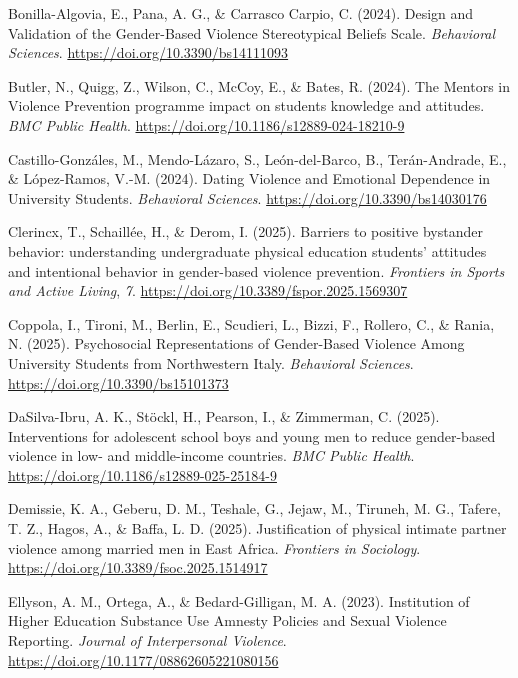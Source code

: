 \documentclass[
  spanish,
  11pt,
  letterpaper,
  DIV=11,
  numbers=noendperiod]{scrreprt}
\newlength{\cslhangindent}
\newenvironment{CSLReferences}[2] %
 {\begin{list}{}{%
  \setlength{\itemindent}{0pt}
  \setlength{\leftmargin}{0pt}
  \setlength{\parsep}{0pt}
  \ifodd #1
   \setlength{\leftmargin}{\cslhangindent}
   \setlength{\itemindent}{-1\cslhangindent}
  \fi
  \setlength{\itemsep}{#2\baselineskip}}}
 {\end{list}}
\begin{document}
\begin{CSLReferences}{1}{0}
Bonilla-Algovia, E., Pana, A. G., \& Carrasco Carpio, C. (2024). Design
and Validation of the Gender-Based Violence Stereotypical Beliefs Scale.
\emph{Behavioral Sciences}. \url{https://doi.org/10.3390/bs14111093}

Butler, N., Quigg, Z., Wilson, C., McCoy, E., \& Bates, R. (2024). The
Mentors in Violence Prevention programme impact on students knowledge
and attitudes. \emph{BMC Public Health}.
\url{https://doi.org/10.1186/s12889-024-18210-9}

Castillo-Gonzáles, M., Mendo-Lázaro, S., León-del-Barco, B.,
Terán-Andrade, E., \& López-Ramos, V.-M. (2024). Dating Violence and
Emotional Dependence in University Students. \emph{Behavioral Sciences}.
\url{https://doi.org/10.3390/bs14030176}

Clerincx, T., Schaillée, H., \& Derom, I. (2025). Barriers to positive
bystander behavior: understanding undergraduate physical education
students' attitudes and intentional behavior in gender-based violence
prevention. \emph{Frontiers in Sports and Active Living}, \emph{7}.
\url{https://doi.org/10.3389/fspor.2025.1569307}

Coppola, I., Tironi, M., Berlin, E., Scudieri, L., Bizzi, F., Rollero,
C., \& Rania, N. (2025). Psychosocial Representations of Gender-Based
Violence Among University Students from Northwestern Italy.
\emph{Behavioral Sciences}. \url{https://doi.org/10.3390/bs15101373}

DaSilva-Ibru, A. K., Stöckl, H., Pearson, I., \& Zimmerman, C. (2025).
Interventions for adolescent school boys and young men to reduce
gender-based violence in low- and middle-income countries. \emph{BMC
Public Health}. \url{https://doi.org/10.1186/s12889-025-25184-9}

Demissie, K. A., Geberu, D. M., Teshale, G., Jejaw, M., Tiruneh, M. G.,
Tafere, T. Z., Hagos, A., \& Baffa, L. D. (2025). Justification of
physical intimate partner violence among married men in East Africa.
\emph{Frontiers in Sociology}.
\url{https://doi.org/10.3389/fsoc.2025.1514917}

Ellyson, A. M., Ortega, A., \& Bedard-Gilligan, M. A. (2023).
Institution of Higher Education Substance Use Amnesty Policies and
Sexual Violence Reporting. \emph{Journal of Interpersonal Violence}.
\url{https://doi.org/10.1177/08862605221080156}


\end{CSLReferences}
\end{document}
